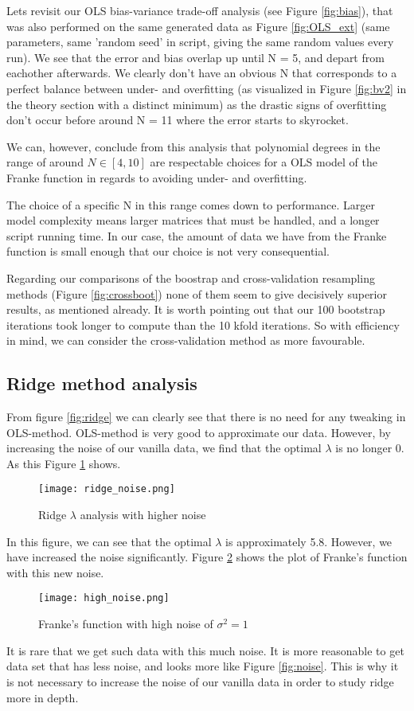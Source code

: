 \documentclass[reprint,english,notitlepage]{revtex4-1}  %
\begin{document}
Lets revisit our OLS bias-variance trade-off analysis (see Figure \ref{fig:bias}), that was also performed on the same generated data as Figure \ref{fig:OLS_ext} (same parameters, same 'random seed' in script, giving the same random values every run). We see that the error and bias overlap up until N = 5, and depart from eachother afterwards. We clearly don't have an obvious N that corresponds to a perfect balance between under- and overfitting (as visualized in Figure \ref{fig:bv2} in the theory section with a distinct minimum) as the drastic signs of overfitting don't occur before around N = 11 where the error starts to skyrocket.

We can, however, conclude from this analysis that polynomial degrees in the range of around $N \in [4, 10]$ are respectable choices for a OLS model of the Franke function in regards to avoiding under- and overfitting.

The choice of a specific N in this range comes down to performance. Larger model complexity means larger matrices that must be handled, and a longer script running time. In our case, the amount of data we have from the Franke function is small enough that our choice is not very consequential.

Regarding our comparisons of the boostrap and cross-validation resampling methods (Figure \ref{fig:crossboot}) none of them seem to give decisively superior results, as mentioned already. It is worth pointing out that our 100 bootstrap iterations took longer to compute than the 10 kfold iterations. So with efficiency in mind, we can consider the cross-validation method as more favourable.

\subsection{Ridge method analysis}
From figure \ref{fig:ridge} we can clearly see that there is no need for any tweaking in OLS-method. OLS-method is very good to approximate our data. However, by increasing the noise of our vanilla data, we find that the optimal $\lambda$ is no longer 0. As this Figure \ref{fig:ridge_noise} shows.

\begin{figure}[h!]
    \centering
    \texttt{[image: ridge\_noise.png]}
    \caption{Ridge $\lambda$ analysis with higher noise}
    \label{fig:ridge_noise}
\end{figure}

In this figure, we can see that the optimal $\lambda$ is approximately 5.8. However, we have increased the noise significantly. Figure \ref{fig:high_noise} shows the plot of Franke's function with this new noise.
\begin{figure}[h!]
    \centering
    \texttt{[image: high\_noise.png]}
    \caption{Franke's function with high noise of $\sigma^2 = 1$ }
    \label{fig:high_noise}
\end{figure}
It is rare that we get such data with this much noise. It is more reasonable to get data set that has less noise, and looks more like Figure \ref{fig:noise}. This is why it is not necessary to increase the noise of our vanilla data in order to study ridge more in depth.
\end{document}
